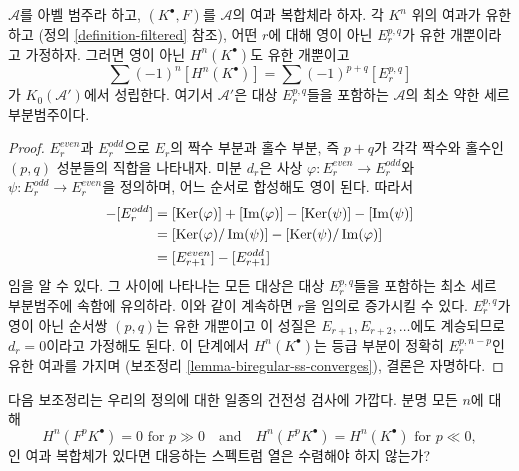 \begin{lemma}
\label{lemma-biregular-ss-relation-in-K0}
$\mathcal{A}$를 아벨 범주라 하고, $(K^\bullet, F)$를 $\mathcal{A}$의
여과 복합체라 하자. 각 $K^n$ 위의 여과가 유한하고
(정의 \ref{definition-filtered} 참조), 어떤 $r$에 대해 영이 아닌
$E_r^{p, q}$가 유한 개뿐이라고 가정하자. 그러면 영이 아닌
$H^n(K^\bullet)$도 유한 개뿐이고
$$
\sum (-1)^n[H^n(K^\bullet)] = \sum (-1)^{p + q} [E_r^{p, q}]
$$
가 $K_0(\mathcal{A}')$에서 성립한다. 여기서 $\mathcal{A}'$은 대상
$E_r^{p, q}$들을 포함하는 $\mathcal{A}$의 최소 약한 세르 부분범주이다.
\end{lemma}

\begin{proof}
$E_r^{even}$과 $E_r^{odd}$으로 $E_r$의 짝수 부분과 홀수 부분, 즉
$p + q$가 각각 짝수와 홀수인 $(p, q)$ 성분들의 직합을 나타내자.
미분 $d_r$은 사상 $\varphi : E_r^{even} \to E_r^{odd}$와
$\psi : E_r^{odd} \to E_r^{even}$을 정의하며, 어느 순서로 합성해도
영이 된다. 따라서
\begin{align*}
[E_r^{even}] - [E_r^{odd}] & =
[\Ker(\varphi)] + [\Im(\varphi)] - [\Ker(\psi)] - [\Im(\psi)] \\
& =
[\Ker(\varphi)/\Im(\psi)] - [\Ker(\psi)/\Im(\varphi)] \\
& =
[E_{r + 1}^{even}] - [E_{r + 1}^{odd}]
\end{align*}
임을 알 수 있다. 그 사이에 나타나는 모든 대상은 대상
$E_r^{p, q}$들을 포함하는 최소 세르 부분범주에 속함에 유의하라.
이와 같이 계속하면 $r$을 임의로 증가시킬 수 있다. $E_r^{p, q}$가
영이 아닌 순서쌍 $(p, q)$는 유한 개뿐이고 이 성질은
$E_{r + 1}, E_{r + 2}, \ldots$에도 계승되므로 $d_r = 0$이라고 가정해도
된다. 이 단계에서 $H^n(K^\bullet)$는 등급 부분이 정확히
$E_r^{p, n - p}$인 유한 여과를 가지며
(보조정리 \ref{lemma-biregular-ss-converges}), 결론은 자명하다.
\end{proof}

\noindent
다음 보조정리는 우리의 정의에 대한 일종의 건전성 검사에 가깝다.
분명 모든 $n$에 대해
$$
H^n(F^pK^\bullet) = 0\text{ for }p \gg 0
\quad\text{and}\quad
H^n(F^pK^\bullet) = H^n(K^\bullet)\text{ for }p \ll 0,
$$
인 여과 복합체가 있다면 대응하는 스펙트럼 열은 수렴해야 하지 않는가?

